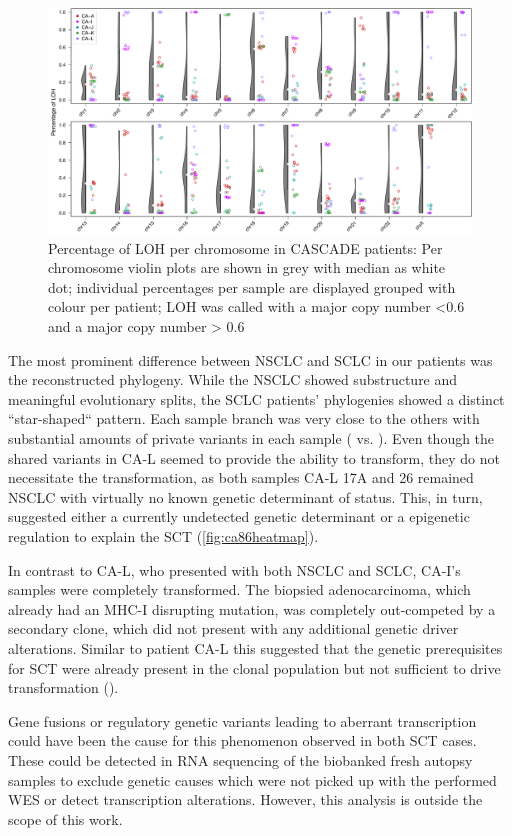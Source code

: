\begin{figure}[ht]
\centering
\includegraphics[width=.99\linewidth]{Figures/CASCADE/LOH_perChrom.pdf}
\caption[Percentage of LOH per chromosome in CASCADE patients]{Percentage of LOH per chromosome in CASCADE patients: Per chromosome violin plots are shown in grey with median as white dot; individual percentages per sample are displayed grouped with colour per patient; LOH was called with a major copy number <0.6 and a major copy number > 0.6} \label{fig:cascadeLOH}
\end{figure}


The most prominent difference between NSCLC and SCLC in our patients was the reconstructed phylogeny. While the NSCLC showed substructure and meaningful evolutionary splits, the SCLC patients' phylogenies showed a distinct ``star-shaped`` pattern. Each sample branch was very close to the others with substantial amounts of private variants in each sample ( vs. ). Even though the shared variants in CA-L seemed to provide the ability to transform, they do not necessitate the transformation, as both samples CA-L 17A and 26 remained NSCLC with virtually no known genetic determinant of status. This, in turn, suggested either a currently undetected genetic determinant or a  epigenetic regulation to explain the SCT (\autoref{fig:ca86heatmap}).

In contrast to CA-L, who presented with both NSCLC and SCLC, CA-I's samples were completely transformed. The biopsied adenocarcinoma, which already had an MHC-I disrupting mutation, was completely out-competed by a secondary clone, which did not present with any additional genetic driver alterations. Similar to patient CA-L this suggested that the genetic prerequisites for SCT were already present in the clonal population but not sufficient to drive transformation (). 

Gene fusions or regulatory genetic variants leading to aberrant transcription could have been the cause for this phenomenon observed in both SCT cases. These could be detected in RNA sequencing of the biobanked fresh autopsy samples to exclude genetic causes which were not picked up with the performed WES or detect transcription alterations. However, this analysis is outside the scope of this work.

